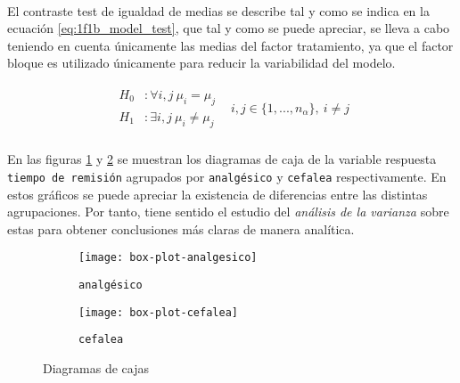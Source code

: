 \documentclass[11pt]{article}
\begin{document}
      \paragraph{}
      El contraste test de igualdad de medias se describe tal y como se indica en la ecuación \eqref{eq:1f1b_model_test}, que tal y como se puede apreciar, se lleva a cabo teniendo en cuenta únicamente las medias del factor tratamiento, ya que el factor bloque es utilizado únicamente para reducir la variabilidad del modelo.

      \begin{align}
      \label{eq:1f1b_model_test}
        \begin{split}
          H_0 &: \forall i,j \ \mu_i = \mu_j  \\
          H_1 &: \exists i,j \ \mu_i \neq \mu_j
        \end{split} &
        i,j\in \{1,...,n_\alpha\}, \ i \neq j
      \end{align}

      \paragraph{}
      En las figuras \ref{fig:boxplot-analgesico} y \ref{fig:boxplot-cefalea} se muestran los diagramas de caja de la variable respuesta \texttt{tiempo de remisión} agrupados por \texttt{analgésico} y \texttt{cefalea} respectivamente. En estos gráficos se puede apreciar la existencia de diferencias entre las distintas agrupaciones. Por tanto, tiene sentido el estudio del \emph{análisis de la varianza} sobre estas para obtener conclusiones más claras de manera analítica.

      \begin{figure}[!h]
        \centering
        \begin{subfigure}{.5\textwidth}
          \centering
          \texttt{[image: box-plot-analgesico]}
          \caption{\texttt{analgésico}}
          \label{fig:boxplot-analgesico}
        \end{subfigure}%
        \begin{subfigure}{.5\textwidth}
          \centering
          \texttt{[image: box-plot-cefalea]}
          \caption{\texttt{cefalea}}
          \label{fig:boxplot-cefalea}
        \end{subfigure}
        \caption{Diagramas de cajas}
        \label{fig:boxplot}
      \end{figure}
\end{document}
